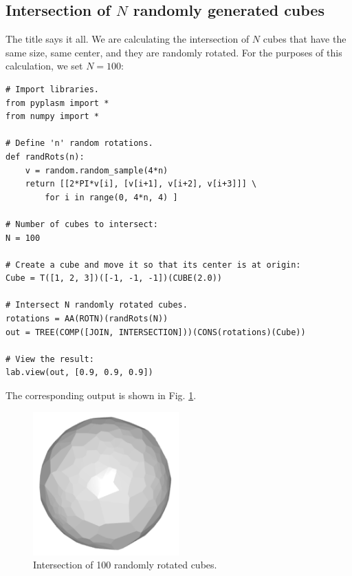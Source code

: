 \documentclass{article}
\begin{document}
\subsection{Intersection of $N$ randomly generated cubes}

The title says it all. We are calculating the intersection of 
$N$ cubes that have the same size, same center, and they are 
randomly rotated. For the purposes of this calculation, we
set $N = 100$:

\begin{verbatim}
# Import libraries.
from pyplasm import *
from numpy import *

# Define 'n' random rotations.
def randRots(n):
    v = random.random_sample(4*n)
    return [[2*PI*v[i], [v[i+1], v[i+2], v[i+3]]] \
        for i in range(0, 4*n, 4) ]

# Number of cubes to intersect:
N = 100
  
# Create a cube and move it so that its center is at origin:
Cube = T([1, 2, 3])([-1, -1, -1])(CUBE(2.0))

# Intersect N randomly rotated cubes.
rotations = AA(ROTN)(randRots(N))
out = TREE(COMP([JOIN, INTERSECTION]))(CONS(rotations)(Cube))

# View the result:
lab.view(out, [0.9, 0.9, 0.9])
\end{verbatim}
\noindent
The corresponding output is shown in Fig. \ref{fig:random_cubes}.

\newpage

\begin{figure}[!ht]
\begin{center}
\includegraphics[width=0.5\textwidth]{img/random_cubes.png}
\end{center}
\vspace{-2mm}
\caption{Intersection of 100 randomly rotated cubes.}
\label{fig:random_cubes}
\end{figure}
\noindent
\end{document}
